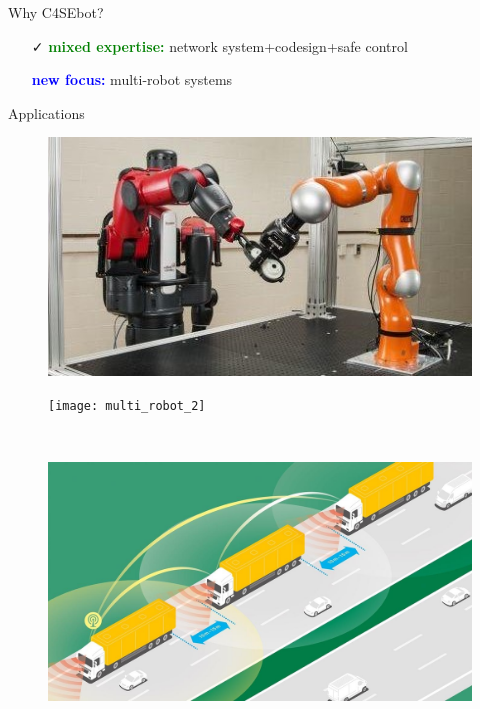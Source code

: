 \documentclass[10pt,xcolor={dvipsnames}]{beamer}
\newcommand{\blue}[1]{\textcolor{blue}{#1}}
\newcommand{\green}[1]{\textcolor{Green}{#1}}
\begin{document}
\begin{frame}{Why C4SEbot?}
		\vspace{5mm}
		\begin{itemize}
			\item[\faCheck] \green{\textbf{mixed expertise:}} network system+codesign+safe control\\
			\item[\faExchange] \blue{\textbf{new focus:}} multi-robot systems
		\end{itemize}
	
	\end{frame}
	
	\begin{frame}{Applications}
		
		\begin{figure}
			\centering
			\begin{minipage}[l]{.5\linewidth}
				\centering
				\includegraphics[height=.5\linewidth,width=\linewidth,keepaspectratio,clip]{multi_robot_1}
			\end{minipage}%
			\begin{minipage}[r]{.5\linewidth}
				\centering
				\texttt{[image: multi\_robot\_2]}
			\end{minipage}\\
			\vspace{5mm}
			\begin{minipage}[l]{.5\linewidth}
				\centering
				\includegraphics[height=.5\linewidth,width=\linewidth,keepaspectratio,clip]{multi_robot_3}

\end{minipage}
\end{figure}
\end{frame}
\end{document}
